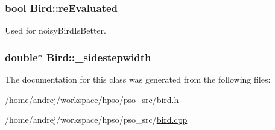 \hypertarget{classBird_450369f9a336c54c757ab789bd89a405}{
\subsubsection{\setlength{\rightskip}{0pt plus 5cm}bool {\bf Bird::reEvaluated}}}
\label{classBird_450369f9a336c54c757ab789bd89a405}


Used for noisyBirdIsBetter. 

\hypertarget{classBird_4f3eb3475988373f5339123f09bda050}{
\subsubsection{\setlength{\rightskip}{0pt plus 5cm}double$\ast$ {\bf Bird::\_\-sidestepwidth}}}
\label{classBird_4f3eb3475988373f5339123f09bda050}




The documentation for this class was generated from the following files:\begin{CompactItemize}
\item 
/home/andrej/workspace/hpso/pso\_\-src/\hyperlink{bird_8h}{bird.h}\item 
/home/andrej/workspace/hpso/pso\_\-src/\hyperlink{bird_8cpp}{bird.cpp}\end{CompactItemize}

